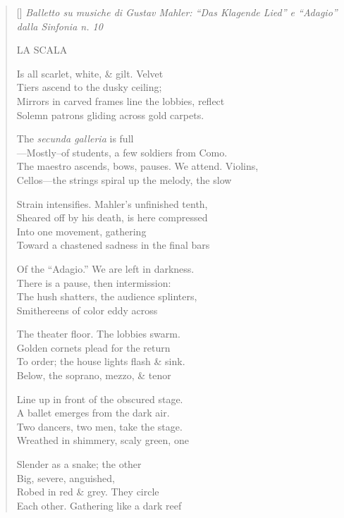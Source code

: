 \label{ch:milano_la_scala}
\settowidth{\versewidth}{Balletto su musiche di Gustav Mahler: “Das Klagende Lied” e “Adagio” dalla Sinfonia n. 10   }
\begin{verse}[\versewidth]
\textit{Balletto su musiche di Gustav Mahler: ``Das Klagende Lied'' e ``Adagio'' dalla Sinfonia n. 10}   

LA SCALA

Is all scarlet, white, \& gilt. Velvet\\
Tiers ascend to the dusky ceiling;\\
Mirrors in carved frames line the lobbies, reflect\\
Solemn patrons gliding across gold carpets.

The \textit{secunda galleria} is full\\
---Mostly--of students, a few soldiers from Como.\\
The maestro ascends, bows, pauses. We attend.  Violins,\\
Cellos---the strings spiral up the melody, the slow

Strain intensifies.  Mahler's unfinished tenth,\\
Sheared off by his death, is here compressed\\
Into one movement, gathering\\
Toward a chastened sadness in the final bars

Of the ``Adagio.'' We are left in darkness.\\
There is a pause, then intermission:\\
The hush shatters, the audience splinters,\\
Smithereens of color eddy across

The theater floor.  The lobbies swarm.\\
Golden cornets plead for the return\\
To order; the house lights flash \& sink.\\
Below, the soprano, mezzo, \& tenor

Line up in front of the obscured stage.\\
A ballet emerges from the dark air.\\
Two dancers, two men, take the stage.\\
Wreathed in shimmery, scaly green, one

Slender as a snake; the other\\
Big, severe, anguished,\\
Robed in red \& grey.   They circle\\
Each other.  Gathering like a dark reef


\end{verse}
